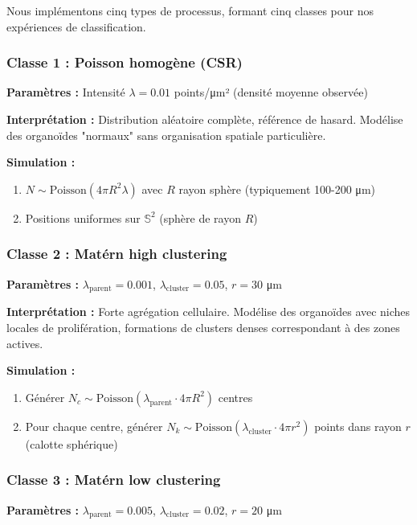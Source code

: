 Nous implémentons cinq types de processus, formant cinq classes pour nos expériences de classification.

\subsubsection{Classe 1 : Poisson homogène (CSR)}

\textbf{Paramètres :} Intensité $\lambda = 0.01$ points/μm² (densité moyenne observée)

\textbf{Interprétation :} Distribution aléatoire complète, référence de hasard. Modélise des organoïdes "normaux" sans organisation spatiale particulière.

\textbf{Simulation :}
\begin{enumerate}
    \item $N \sim \text{Poisson}(4\pi R^2 \lambda)$ avec $R$ rayon sphère (typiquement 100-200 μm)
    \item Positions uniformes sur $\mathbb{S}^2$ (sphère de rayon $R$)
\end{enumerate}

\subsubsection{Classe 2 : Matérn high clustering}

\textbf{Paramètres :} $\lambda_{\text{parent}} = 0.001$, $\lambda_{\text{cluster}} = 0.05$, $r = 30$ μm

\textbf{Interprétation :} Forte agrégation cellulaire. Modélise des organoïdes avec niches locales de prolifération, formations de clusters denses correspondant à des zones actives.

\textbf{Simulation :}
\begin{enumerate}
    \item Générer $N_c \sim \text{Poisson}(\lambda_{\text{parent}} \cdot 4\pi R^2)$ centres
    \item Pour chaque centre, générer $N_k \sim \text{Poisson}(\lambda_{\text{cluster}} \cdot 4\pi r^2)$ points dans rayon $r$ (calotte sphérique)
\end{enumerate}

\subsubsection{Classe 3 : Matérn low clustering}

\textbf{Paramètres :} $\lambda_{\text{parent}} = 0.005$, $\lambda_{\text{cluster}} = 0.02$, $r = 20$ μm

